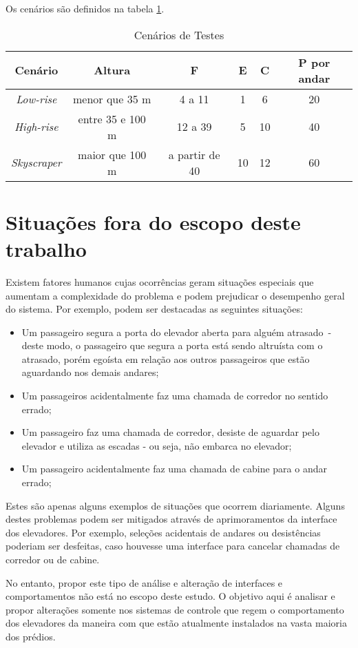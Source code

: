 Os cenários são definidos na tabela \ref{tab:cenarios}.

\begin{table}[htb!]
\centering
\caption{Cenários de Testes}
\label{tab:cenarios}
\begin{tabular}{|c|c|c|c|c|c|}
\hline
{\bf Cenário} & {\bf Altura} & {\bf F}  & {\bf E} & {\bf C} & {\bf P por andar}
\\ \hline
{\it Low-rise}   & menor que 35 m    & 4 a 11         & 1  & 6  & 20 \\ \hline
{\it High-rise}  & entre 35 e 100 m  & 12 a 39        & 5  & 10 & 40 \\ \hline
{\it Skyscraper} & maior que 100 m   & a partir de 40 & 10 & 12 & 60 \\ \hline
\end{tabular}
\end{table}

\section{\label{section:difficulties}Situações fora do escopo deste trabalho}

Existem fatores humanos cujas ocorrências geram situações especiais que aumentam
a complexidade do problema e podem prejudicar o desempenho geral do sistema. Por
exemplo, podem ser destacadas as seguintes situações:

\begin{itemize}
  \item Um passageiro segura a porta do elevador aberta para alguém atrasado~-~
        deste modo, o passageiro que segura a porta está sendo altruísta com o
        atrasado, porém egoísta em relação aos outros passageiros que estão
        aguardando nos demais andares;
  \item Um passageiros acidentalmente faz uma chamada de corredor no sentido
        errado;
  \item Um passageiro faz uma chamada de corredor, desiste de aguardar pelo
        elevador e utiliza as escadas - ou seja, não embarca no elevador;
  \item Um passageiro acidentalmente faz uma chamada de cabine para o andar
        errado;
\end{itemize}

Estes são apenas alguns exemplos de situações que ocorrem diariamente. Alguns
destes problemas podem ser mitigados através de aprimoramentos da interface dos
elevadores. Por exemplo, seleções acidentais de andares ou desistências poderiam
ser desfeitas, caso houvesse uma interface para cancelar chamadas de corredor ou
de cabine.

No entanto, propor este tipo de análise e alteração de interfaces e
comportamentos não está no escopo deste estudo. O objetivo aqui é analisar e
propor alterações somente nos sistemas de controle que regem o comportamento dos
elevadores da maneira com que estão atualmente instalados na vasta maioria dos
prédios.